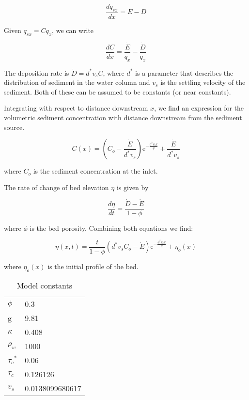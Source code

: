 \documentclass[11pt]{article}
\newcommand{\me}{\mathrm{e}}
\begin{document}
\begin{equation}
\frac{dq_{sx}}{dx} = \dot{E} - \dot{D}
\end{equation}

Given $q_{sx} = Cq_x$, we can write

\begin{equation}
\frac{dC}{dx} = \frac{\dot{E}}{q_x} - \frac{\dot{D}}{q_x}
\end{equation}

The deposition rate is $\dot{D} = d^*v_sC$, where $d^*$ is a parameter that describes the distribution of sediment in the water column and $v_s$ is the settling velocity of the sediment. Both of these can be assumed to be constants (or near constants).

Integrating with respect to distance downstream $x$, we find an expression for the volumetric sediment concentration with distance downstream from the sediment source.

\begin{equation}
C(x) = \left(C_o - \frac{\dot{E}}{d^*v_s}\right)\me^{-\frac{d^* v_s x}{q}} + \frac{\dot{E}}{d^* v_s}
\end{equation}

\noindent where $C_o$ is the sediment concentration at the inlet.

The rate of change of bed elevation $\eta$ is given by

\begin{equation}
\frac{d\eta}{dt} = \frac{\dot{D} - \dot{E}}{1 - \phi}
\end{equation}

\noindent where $\phi$ is the bed porosity. Combining both equations we find:

\begin{equation}
\eta(x,t) = \frac{t}{1-\phi} \left(d^* v_s C_o - \dot{E}\right) \me^{-\frac{d^* v_s x}{q}} + \eta_o(x)
\end{equation}

\noindent where $\eta_o(x)$ is the initial profile of the bed.


\begin{table}[]
\centering
\caption{Model constants}
\label{table:model_params}
\begin{tabular}{ll}
$\phi$ & 0.3 \\
g & 9.81 \\
$\kappa$ & 0.408 \\
$\rho_w$ & 1000 \\
${\tau_c}^*$ & 0.06 \\
${\tau_c}$ & 0.126126 \\
$v_s$ & 0.0138099680617
\end{tabular}
\end{table}
\end{document}
